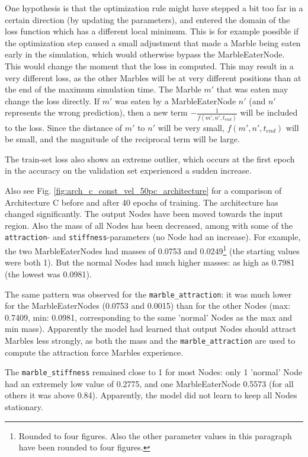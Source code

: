 One hypothesis is that the optimization rule might have stepped a bit too far in a certain direction (by updating the parameters), 
and entered the domain of the loss function which has a different local minimum. 
This is for example possible if the optimization step caused a small adjustment that made a Marble being eaten early in the simulation, 
which would otherwise bypass the MarbleEaterNode. This would change the moment that the loss in computed. 
This may result in a very different loss, as the other Marbles will be at very different positions than at the end of the maximum simulation time.
The Marble $m'$ that was eaten may change the loss directly. 
If $m'$ was eaten by a MarbleEaterNode $n'$ (and $n'$ represents the wrong prediction), 
then a new term $- \frac{1}{f(m', n', t_{end})}$ will be included to the loss. 
Since the distance of $m'$ to $n'$ will be very small, $f(m', n', t_{end})$ will be small,
and the magnitude of the reciprocal term will be large.

The train-set loss also shows an extreme outlier, which occurs at the first epoch in the accuracy on the validation set experienced a sudden increase. 

Also see Fig. \ref{fig:arch_c_const_vel_50pc_architecture} for a comparison of Architecture C before and after 40 epochs of training. The architecture has changed significantly. The output Nodes have been moved towards the input region. Also the mass of all Nodes has been decreased, among with some of the \texttt{attraction}- and \texttt{stiffness}-parameters (no Node had an increase). For example, the two MarbleEaterNodes had masses of 0.0753 and 0.0249\footnote{Rounded to four figures. Also the other parameter values in this paragraph have been rounded to four figures.} (the starting values were both 1). But the normal Nodes had much higher masses: as high as 0.7981 (the lowest was 0.0981).

The same pattern was observed for the \texttt{marble\_attraction}: 
it was much lower for the MarbleEaterNodes (0.0753 and 0.0015) 
than for the other Nodes 
(max: 0.7409, min: 0.0981, corresponding to the same 'normal' Nodes as the max and min mass).
Apparently the model had learned that output Nodes should attract Marbles less strongly, 
as both the mass and the \texttt{marble\_attraction} are used to compute the attraction force Marbles experience.

The \texttt{marble\_stiffness} remained close to 1 for most Nodes: 
only 1 'normal' Node had an extremely low value of 0.2775, 
and one MarbleEaterNode 0.5573 (for all others it was above 0.84). 
Apparently, the model did not learn to keep all Nodes stationary. 

